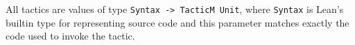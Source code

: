 All tactics are values of type \texttt{Syntax -\textgreater\ TacticM Unit}, where \texttt{Syntax} is Lean's builtin type for representing source code and this parameter matches exactly the code used to invoke the tactic.

